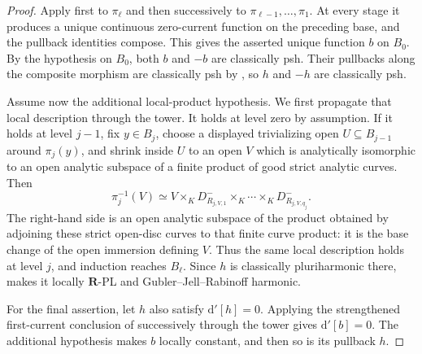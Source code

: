 \begin{proof}
Apply  first to \(\pi_\ell\)
and then successively to \(\pi_{\ell-1},\ldots,\pi_1\).  At every stage
it produces a unique continuous zero-current function on the preceding
base, and the pullback identities compose.  This gives the asserted unique
function \(b\) on \(B_0\).  By the hypothesis on \(B_0\), both \(b\) and
\(-b\) are classically psh.  Their pullbacks along the composite morphism
are classically psh by \cite[Proposition~4.2(6)]{GR25Classical}, so \(h\)
and \(-h\) are classically psh.

Assume now the additional local-product hypothesis.  We first propagate
that local description through the tower.  It holds at level zero by
assumption.  If it holds at level \(j-1\), fix \(y\in B_j\), choose a
displayed trivializing open \(U\subseteq B_{j-1}\) around \(\pi_j(y)\),
and shrink inside \(U\) to an open \(V\) which is analytically isomorphic
to an open analytic subspace of a finite product of good strict analytic
curves.  Then
\[
 \pi_j^{-1}(V)\simeq
 V\times_KD_{R_{j,V,1}}^-\times_K\cdots\times_KD_{R_{j,V,q_j}}^-.
\]
The right-hand side is an open analytic subspace of the product obtained by
adjoining these strict open-disc curves to that finite curve product: it is
the base change of the open immersion defining \(V\).  Thus the same local
description holds at level \(j\), and induction reaches \(B_\ell\).
Since \(h\) is classically pluriharmonic there,
 makes it locally
\(\mathbf R\)-PL and Gubler--Jell--Rabinoff harmonic.

For the final assertion, let \(h\) also satisfy \(\mathrm d'[h]=0\).
Applying the strengthened first-current conclusion of
 successively through the
tower gives \(\mathrm d'[b]=0\).  The additional hypothesis makes \(b\)
locally constant, and then so is its pullback \(h\).
\end{proof}

